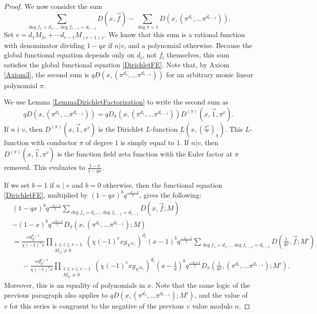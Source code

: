 \documentclass[11pt,letterpaper]{article}
\theoremstyle{definition}
\theoremstyle{remark}
\numberwithin{equation}{section}
\theoremstyle{dotless}
\newcommand{\res}[2]{\left(\frac{#1}{#2}\right)}
\begin{document}
\begin{proof}
We now consider the sum 
\begin{equation}
\sum_{\deg f_1 = d_1, \ldots \deg f_{r-1}=d_{r-1}} D(x, \vec{f}) - \sum_{\deg \pi =1} D(x, (\pi^{d_1}, \ldots \pi^{d_{r-1}})).
\end{equation}
Set $v=d_1 M_{1r} + \cdots d_{r-1} M_{(r-1) \, r}$. We know that this sum is a rational function with denominator dividing $1-qx$ if $n|v$, and a polynomial otherwise. Because the global functional equation depends only on $d_i$, not $f_i$ themselves, this sum satisfies the global functional equation \eqref{DirichletFE}. Note that, by Axiom \ref{Axiom3}, the second sum is $qD(x, (\pi^{d_1}, \ldots \pi^{d_{r-1}}))$ for an arbitrary monic linear polynomial $\pi$. 

We use Lemma \ref{LemmaDirichletFactorization} to write the second sum as 
\begin{equation*}
q D(x, (\pi^{d_1}, \ldots \pi^{d_{r-1}})) = q D_\pi(x, (\pi^{d_1}, \ldots \pi^{d_{r-1}}))D^{(\pi)}(x, \vec{1}, \pi^v).
\end{equation*}
If $n \nmid v$, then $D^{(\pi)}(x, \vec{1}, \pi^v)$ is the Dirichlet $L$-function $L(x, \res{\pi^v}{*}_\chi)$. This $L$-function with conductor $\pi$ of degree $1$ is simply equal to $1$. If $n | v$, then $D^{(\pi)}(x, \vec{1}, \pi^v)$ is the function field zeta function with the Euler factor at $\pi$ removed. This evaluates to $\frac{1-x}{1-qx}$. 

If we set $b=1$ if $n \mid v$ and $b=0$ otherwise, then the functional equation \eqref{DirichletFE}, multiplied by $(1-qx)^b q^{\frac{-A-1}{2}}$, gives the following:
\begin{equation} \label{LongDirichletFE}
\begin{split}
&(1-qx)^b q^{\frac{-A-1}{2}}\sum_{\deg f_1 = d_1, \ldots \deg f_{r-1}=d_{r-1}} D(x, \vec{f}; M) \\&
-(1-x)^b q^{\frac{-A+1}{2}} D_\pi(x, (\pi^{d_1}, \ldots \pi^{d_{r-1}}); M) \\
&=\frac{\omega g_{\chi^{v}} ^{b-1}}{\chi(-1)^v x} \prod_{\substack{1 \leq i \leq r-1 \\ M_{ir} \neq 0}} (\chi(-1)^v x g_{\chi^{M_{ir}}} )^{d_i} \left(x-1\right)^b q^{\frac{-A-1}{2}}\sum_{\deg f_1 = d_1, \ldots \deg f_{r-1}=d_{r-1}} D\left(\frac{1}{qx}, \vec{f}; M'\right) \\
&\phantom{=}-\frac{\omega g_{\chi^{v}} ^{b-1}}{\chi(-1)^v x} \prod_{\substack{1 \leq i \leq r-1 \\ M_{ir} \neq 0}} (\chi(-1)^v x g_{\chi^{M_{ir}}} )^{d_i} \left(x-\frac{1}{q}\right)^b q^{\frac{-A+1}{2}} D_\pi\left(\frac{1}{qx}, (\pi^{d_1}, \ldots \pi^{d_{r-1}}); M'\right).
\end{split}
\end{equation}
Moreover, this is an equality of polynomials in $x$. Note that the same logic of the previous paragraph also applies to $q D(x, (\pi^{d_1}, \ldots \pi^{d_{r-1}}); M')$, and the value of $v$ for this series is congruent to the negative of the previous $v$ value modulo $n$. 


\end{proof}
\end{document}
